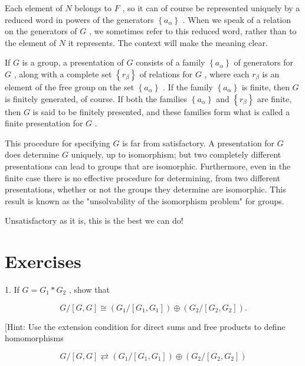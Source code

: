Each element of \(N\) belongs to \(F\) , so it can of course be represented uniquely by a reduced word in powers of the generators \(\left\{  {a}_{\alpha }\right\}\) . When we speak of a relation on the generators of \(G\) , we sometimes refer to this reduced word, rather than to the element of \(N\) it represents. The context will make the meaning clear.

\begin{definition} If \(G\) is a group, a presentation of \(G\) consists of a family \(\left\{  {a}_{\alpha }\right\}\) of generators for \(G\) , along with a complete set \(\left\{  {r}_{\beta }\right\}\) of relations for \(G\) , where each \({r}_{\beta }\) is an element of the free group on the set \(\left\{  {a}_{\alpha }\right\}\) . If the family \(\left\{  {a}_{\alpha }\right\}\) is finite, then \(G\) is finitely generated, of course. If both the families \(\left\{  {a}_{\alpha }\right\}\) and \(\left\{  {r}_{\beta }\right\}\) are finite, then \(G\) is said to be finitely presented, and these families form what is called a finite presentation for \(G\) .
\end{definition}

This procedure for specifying \(G\) is far from satisfactory. A presentation for \(G\) does determine \(G\) uniquely, up to isomorphism; but two completely different presentations can lead to groups that are isomorphic. Furthermore, even in the finite case there is no effective procedure for determining, from two different presentations, whether or not the groups they determine are isomorphic. This result is known as the "unsolvability of the isomorphism problem" for groups.

Unsatisfactory as it is, this is the best we can do!

\section*{Exercises}

1. If \(G = {G}_{1} * {G}_{2}\) , show that

\[
G/\left\lbrack  {G,G}\right\rbrack \cong  \left( {{G}_{1}/\left\lbrack  {{G}_{1},{G}_{1}}\right\rbrack  }\right)  \oplus  \left( {{G}_{2}/\left\lbrack  {{G}_{2},{G}_{2}}\right\rbrack  }\right) .
\]

[Hint: Use the extension condition for direct sums and free products to define homomorphisms

\[
G/\left\lbrack  {G,G}\right\rbrack \rightleftarrows  \left( {{G}_{1}/\left\lbrack  {{G}_{1},{G}_{1}}\right\rbrack  }\right)  \oplus  \left( {{G}_{2}/\left\lbrack  {{G}_{2},{G}_{2}}\right\rbrack  }\right)
\]

